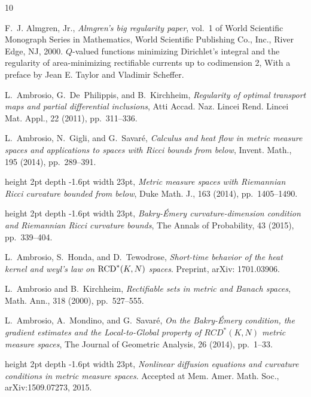 \documentclass[reqno,11pt]{article}
\numberwithin{equation}{section}
\begin{document}
%
%
\def\cprime{$'$} \def\cprime{$'$}
\begin{thebibliography}{10}

{\sc F.~J. Almgren, Jr.}, {\em Almgren's big regularity paper}, vol.~1 of World
  Scientific Monograph Series in Mathematics, World Scientific Publishing Co.,
  Inc., River Edge, NJ, 2000.
\newblock $Q$-valued functions minimizing Dirichlet's integral and the
  regularity of area-minimizing rectifiable currents up to codimension 2, With
  a preface by Jean E. Taylor and Vladimir Scheffer.

{\sc L.~Ambrosio, G.~De~Philippis, and B.~Kirchheim}, {\em Regularity of
  optimal transport maps and partial differential inclusions}, Atti Accad. Naz.
  Lincei Rend. Lincei Mat. Appl., 22 (2011), pp.~311--336.

{\sc L.~Ambrosio, N.~Gigli, and G.~Savar{\'e}}, {\em Calculus and heat flow in
  metric measure spaces and applications to spaces with {R}icci bounds from
  below}, Invent. Math., 195 (2014), pp.~289--391.

\leavevmode\vrule height 2pt depth -1.6pt width 23pt, {\em Metric measure
  spaces with {R}iemannian {R}icci curvature bounded from below}, Duke Math.
  J., 163 (2014), pp.~1405--1490.

\leavevmode\vrule height 2pt depth -1.6pt width 23pt, {\em Bakry-\'{E}mery
  curvature-dimension condition and {R}iemannian {R}icci curvature bounds}, The
  Annals of Probability, 43 (2015), pp.~339--404.

{\sc L.~Ambrosio, S.~Honda, and D.~Tewodrose}, {\em Short-time behavior of the
  heat kernel and weyl's law on {${\rm RCD}^*(K,N)$} spaces}.
\newblock Preprint, arXiv: 1701.03906.

{\sc L.~Ambrosio and B.~Kirchheim}, {\em Rectifiable sets in metric and
  {B}anach spaces}, Math. Ann., 318 (2000), pp.~527--555.

{\sc L.~Ambrosio, A.~Mondino, and G.~Savar{\'e}}, {\em On the {B}akry-\'{E}mery
  condition, the gradient estimates and the {L}ocal-to-{G}lobal property of
  ${RCD}^*({K}, {N})$ metric measure spaces}, The Journal of Geometric
  Analysis, 26 (2014), pp.~1--33.

\leavevmode\vrule height 2pt depth -1.6pt width 23pt, {\em Nonlinear diffusion
  equations and curvature conditions in metric measure spaces}.
\newblock Accepted at Mem. Amer. Math. Soc., arXiv:1509.07273, 2015.


\end{thebibliography}
\end{document}

